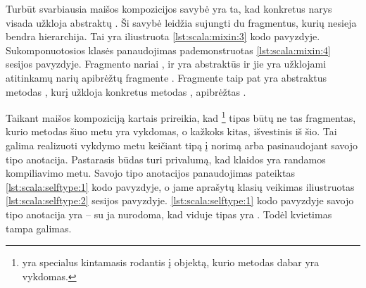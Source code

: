 \begin{scalacodelisting}
  \label{lst:scala:mixin:1}
\end{scalacodelisting}

\begin{scalainterpreterlisting}
  \label{lst:scala:mixin:2}
\end{scalainterpreterlisting}

Turbūt svarbiausia maišos kompozicijos savybė yra ta, kad konkretus
narys visada užkloja abstraktų
\cite[6]{scalable-component-abstractions}. Ši savybė leidžia
sujungti du fragmentus, kurių nesieja bendra hierarchija. Tai yra
iliustruota \ref{lst:scala:mixin:3} kodo pavyzdyje.
Sukomponuotosios klasės  panaudojimas
pademonstruotas \ref{lst:scala:mixin:4}  sesijos
pavyzdyje. Fragmento  nariai
,  ir  yra abstraktūs
ir jie yra užklojami atitinkamų narių apibrėžtų fragmente
. Fragmente  taip pat yra
abstraktus metodas , kurį užkloja konkretus metodas
, apibrėžtas .

\begin{scalacodelisting}
  \label{lst:scala:mixin:3}
\end{scalacodelisting}

\begin{scalainterpreterlisting}
  \label{lst:scala:mixin:4}
\end{scalainterpreterlisting}

Taikant maišos kompoziciją kartais prireikia, kad
\footnote{ yra specialus kintamasis rodantis į
objektą, kurio metodas dabar yra vykdomas.} tipas būtų ne tas fragmentas,
kurio metodas šiuo metu yra vykdomas, o kažkoks kitas, išvestinis
iš šio. Tai galima realizuoti vykdymo metu keičiant 
tipą į norimą arba pasinaudojant  savojo tipo
anotacija. Pastarasis būdas turi privalumą, kad klaidos yra randamos
kompiliavimo metu. Savojo tipo anotacijos panaudojimas pateiktas
\ref{lst:scala:selftype:1} kodo pavyzdyje, o jame aprašytų klasių
veikimas iliustruotas \ref{lst:scala:selftype:2} 
sesijos pavyzdyje. \ref{lst:scala:selftype:1} kodo pavyzdyje savojo tipo
anotacija yra  – su ja nurodoma, kad
 viduje  tipas yra . Todėl
kvietimas  tampa galimas.

